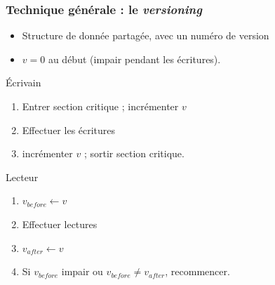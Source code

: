 \documentclass[xcolor={x11names,svgnames},x11names,svgnames]{beamer}
\begin{document}
\begin{frame}[label=versioning]
  \frametitle{Technique générale : le \emph{versioning}}

  \begin{itemize}
  \item Structure de donnée partagée, avec un \alert{numéro de version}
  \item $v = 0$ au début (\alert{impair} pendant les écritures).
  \end{itemize}

  \begin{alertblock}{Écrivain}
    \begin{enumerate}
    \item Entrer section critique ; incrémenter $v$
    \item Effectuer les écritures
    \item incrémenter $v$ ; sortir section critique.
    \end{enumerate}
  \end{alertblock}

  \begin{exampleblock}{Lecteur}
    \begin{enumerate}
    \item $v_{before} \gets v$
    \item Effectuer lectures
    \item $v_{after} \gets v$
    \item Si $v_{before}$ impair ou $v_{before} \neq v_{after}$, recommencer.
    \end{enumerate}
  \end{exampleblock}  
\end{frame}

\end{document}

